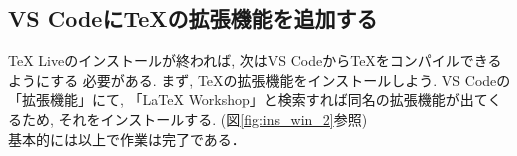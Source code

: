 \subsection{VS CodeにTeXの拡張機能を追加する}
TeX Liveのインストールが終われば, 次はVS Codeから\TeX をコンパイルできるようにする
必要がある. まず, \TeX の拡張機能をインストールしよう. VS Codeの「拡張機能」にて, 
「LaTeX Workshop」と検索すれば同名の拡張機能が出てくるため, それをインストールする. 
(図\ref{fig:ins_win_2}参照)\\

基本的には以上で作業は完了である．